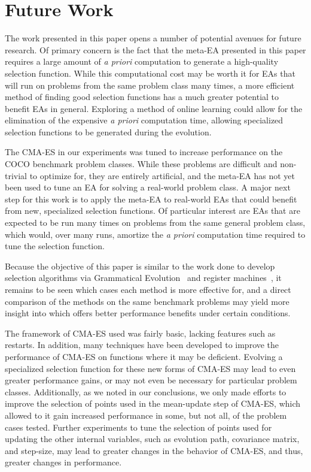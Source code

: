 \documentclass[sigconf]{acmart}
\begin{document}
\section{Future Work}
\label{Future Work}
The work presented in this paper opens a number of potential avenues for future research. Of primary concern is the fact that the meta-EA presented in this paper requires a large amount of \textit{a priori} computation to generate a high-quality selection function. While this computational cost may be worth it for EAs that will run on problems from the same problem class many times, a more efficient method of finding good selection functions has a much greater potential to benefit EAs in general. Exploring a method of online learning could allow for the elimination of the expensive \textit{a priori} computation time, allowing specialized selection functions to be generated during the evolution.

The CMA-ES in our experiments was tuned to increase performance on the COCO benchmark problem classes. While these problems are difficult and non-trivial to optimize for, they are entirely artificial, and the meta-EA has not yet been used to tune an EA for solving a real-world problem class. A major next step for this work is to apply the meta-EA to real-world EAs that could benefit from new, specialized selection functions. Of particular interest are EAs that are expected to be run many times on problems from the same general problem class, which would, over many runs, amortize the \textit{a priori} computation time required to tune the selection function.

Because the objective of this paper is similar to the work done to develop selection algorithms via Grammatical Evolution~\citep{lourencco2013selection} and register machines~\citep{woodward2011selection}, it remains to be seen which cases each method is more effective for, and a direct comparison of the methods on the same benchmark problems may yield more insight into which offers better performance benefits under certain conditions.

The framework of CMA-ES used was fairly basic, lacking features such as restarts. In addition, many techniques have been developed to improve the performance of CMA-ES on functions where it may be deficient. Evolving a specialized selection function for these new forms of CMA-ES may lead to even greater performance gains, or may not even be necessary for particular problem classes. Additionally, as we noted in our conclusions, we only made efforts to improve the selection of points used in the mean-update step of CMA-ES, which allowed to it gain increased performance in some, but not all, of the problem cases tested. Further experiments to tune the selection of points used for updating the other internal variables, such as evolution path, covariance matrix, and step-size, may lead to greater changes in the behavior of CMA-ES, and thus, greater changes in performance.
\end{document}
